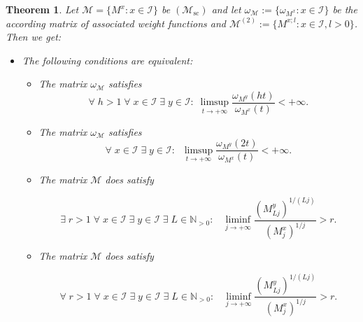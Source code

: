 \documentclass[10pt]{amsart}%
\numberwithin{equation}{section}
\theoremstyle{plain}
\newtheorem{theorem}[proposition]{Theorem}
\newcommand{\NN}{\mathbb{N}}
\let\on=\operatorname
\begin{document}
\begin{theorem}\label{omega1theorem}
Let $\mathcal{M}=\{M^x: x\in\mathcal{I}\}$ be \hyperlink{Msc}{$(\mathcal{M}_{\on{sc}})$} and let $\omega_{\mathcal{M}}:=\{\omega_{M^x}: x\in\mathcal{I}\}$ be the according matrix of associated weight functions and $\mathcal{M}^{(2)}:=\{M^{x;l}: x\in\mathcal{I}, l>0\}$. Then we get:

\begin{itemize}
\item[$(I)$] The following conditions are equivalent:

\begin{itemize}

\item[$(i)$] The matrix $\omega_{\mathcal{M}}$ satisfies
\begin{equation}\label{R-L-consequequstrong}
\forall\;h>1\;\forall\;x\in\mathcal{I}\;\exists\;y\in\mathcal{I}:
\;\limsup_{t\rightarrow+\infty}\frac{\omega_{M^y}(ht)}{\omega_{M^x}(t)}<+\infty.
\end{equation}

\item[$(ii)$] The matrix $\omega_{\mathcal{M}}$ satisfies
\begin{equation}\label{R-L-consequ}
\forall\;x\in\mathcal{I}\;\exists\;y\in\mathcal{I}:\;\;
\limsup_{t\rightarrow+\infty}\frac{\omega_{M^y}(2t)}{\omega_{M^x}(t)}<+\infty.
\end{equation}


\item[$(iii)$] The matrix $\mathcal{M}$ does satisfy

\begin{equation}\label{omega1mixedcharactequmod}
\exists\;r>1\;\forall\;x\in\mathcal{I}\;\exists\;y\in\mathcal{I}\;\exists\;L\in\NN_{>0}:\;\;\;\liminf_{j\rightarrow+\infty}\frac{(M^y_{Lj})^{1/(Lj)}}{(M^x_j)^{1/j}}>r.
\end{equation}

\item[$(iv)$] The matrix $\mathcal{M}$ does satisfy

\begin{equation}\label{omega1mixedcharactequmodstrong}
\forall\;r>1\;\forall\;x\in\mathcal{I}\;\exists\;y\in\mathcal{I}\;\exists\;L\in\NN_{>0}:\;\;\;\liminf_{j\rightarrow+\infty}\frac{(M^y_{Lj})^{1/(Lj)}}{(M^x_j)^{1/j}}>r.
\end{equation}


\end{itemize}
\end{itemize}
\end{theorem}
\end{document}

